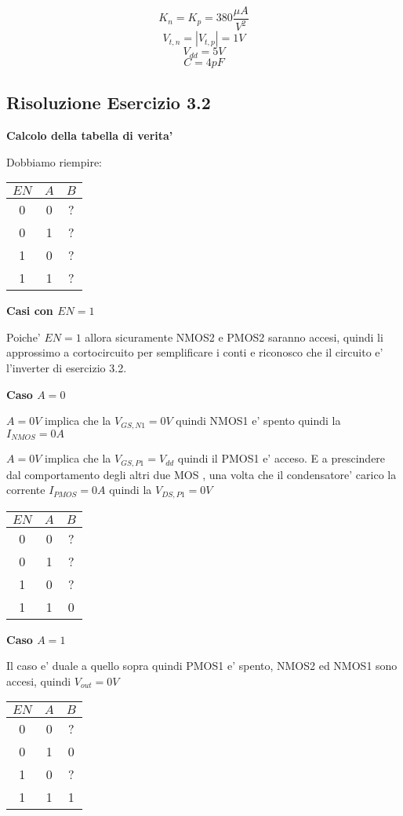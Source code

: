 \documentclass[\main/main.tex]{subfiles}
\begin{document}
\[K_n = K_p = 380\frac{\mu A}{V^2}\]
\[V_{t,n} = |V_{t,p}| = 1V\]
\[V_{dd} = 5V\]
\[C = 4pF\]

\clearpage
\subsection{Risoluzione Esercizio 3.2}
\textbf{Calcolo della tabella di verita'}

Dobbiamo riempire:
\begin{center}
	\begin{tabular}{ c  c | c}
		$EN$ & $A$ & $B$ \\
		\hline
		0    & 0   & ?   \\
		0    & 1   & ?   \\
		1    & 0   & ?   \\
		1    & 1   & ?   \\
	\end{tabular}
\end{center}

\textbf{Casi con $EN = 1$}

Poiche' $EN = 1$ allora sicuramente NMOS2 e PMOS2 saranno accesi, quindi li approssimo a cortocircuito per semplificare i conti e riconosco che il circuito e' l'inverter di esercizio 3.2.

\textbf{Caso $A = 0$}

$A = 0V$ implica che la $V_{GS,N1} = 0V$ quindi NMOS1 e' spento quindi la $I_{NMOS}  = 0A$

$A = 0V$ implica che la $V_{GS,P1} = V_{dd}$ quindi il PMOS1 e' acceso.
E a prescindere dal comportamento degli altri due MOS , una volta che il condensatore' carico la corrente $I_{PMOS} = 0A$ quindi la $V_{DS,P1} = 0V$
\begin{center}
	\begin{tabular}{ c  c | c}
		$EN$ & $A$ & $B$ \\
		\hline
		0    & 0   & ?   \\
		0    & 1   & ?   \\
		1    & 0   & ?   \\
		1    & 1   & 0   \\
	\end{tabular}
\end{center}

\textbf{Caso  $A = 1$}

Il caso e' duale a quello sopra quindi PMOS1 e' spento, NMOS2 ed NMOS1 sono accesi, quindi $V_{out} = 0V$

\begin{center}
	\begin{tabular}{ c  c | c}
		$EN$ & $A$ & $B$ \\
		\hline
		0    & 0   & ?   \\
		0    & 1   & 0   \\
		1    & 0   & ?   \\
		1    & 1   & 1   \\
	\end{tabular}
\end{center}
\end{document}
